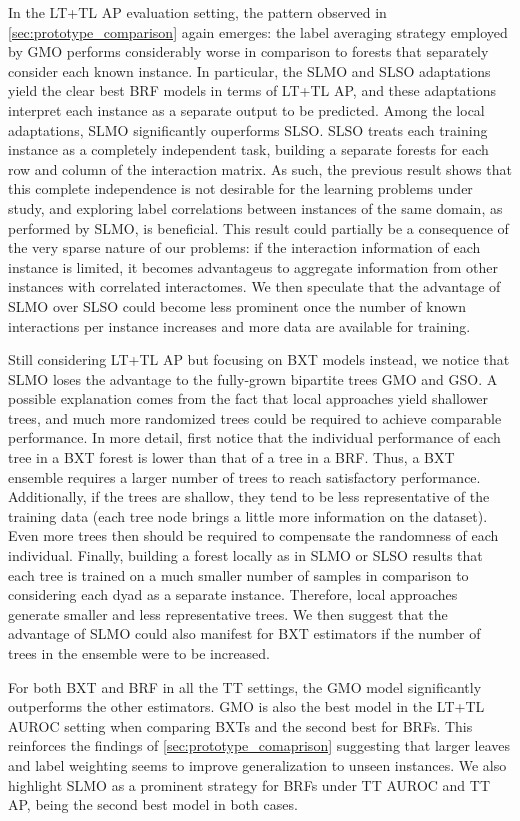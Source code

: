 In the LT+TL AP evaluation setting, the pattern observed in \autoref{sec:prototype_comparison} again emerges: the label averaging strategy employed by GMO performs considerably worse in comparison to forests that separately consider each known instance. In particular, the SLMO and SLSO adaptations yield the clear best BRF models in terms of LT+TL AP, and these adaptations interpret each instance as a separate output to be predicted. Among the local adaptations, SLMO significantly ouperforms SLSO. SLSO treats each training instance as a completely independent task, building a separate forests for each row and column of the interaction matrix. As such, the previous result shows that this complete independence is not desirable for the learning problems under study, and exploring label correlations between instances of the same domain, as performed by SLMO, is beneficial. This result could partially be a consequence of the very sparse nature of our problems: if the interaction information of each instance is limited, it becomes advantageus to aggregate information from other instances with correlated interactomes. We then speculate that the advantage of SLMO over SLSO could become less prominent once the number of known interactions per instance increases and more data are available for training.

Still considering LT+TL AP but focusing on BXT models instead, we notice that SLMO loses the advantage to the fully-grown bipartite trees GMO and GSO. A possible explanation comes from the fact that local approaches yield shallower trees, and much more randomized trees could be required to achieve comparable performance. In more detail, first notice that the individual performance of each tree in a BXT forest is lower than that of a tree in a BRF. Thus, a BXT ensemble requires a larger number of trees to reach satisfactory performance. Additionally, if the trees are shallow, they tend to be less representative of the training data (each tree node brings a little more information on the dataset).
Even more trees then should be required to compensate the randomness of each individual. Finally, building a forest locally as in SLMO or SLSO results that each tree is trained on a much smaller number of samples in comparison to considering each dyad as a separate instance. Therefore, local approaches generate smaller and less representative trees. We then suggest that the advantage of SLMO could also manifest for BXT estimators if the number of trees in the ensemble were to be increased.

For both BXT and BRF in all the TT settings, the GMO model significantly outperforms the other estimators. GMO is also the best model in the LT+TL AUROC setting when comparing BXTs and the second best for BRFs. This reinforces the findings of \autoref{sec:prototype_comaprison} suggesting that larger leaves and label weighting seems to improve generalization to unseen instances.
%
We also highlight SLMO as a prominent strategy for BRFs under TT AUROC and TT AP, being the second best model in both cases.

